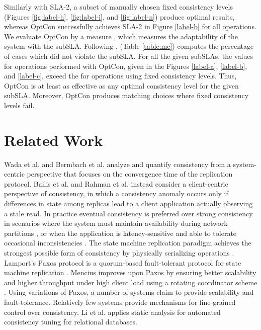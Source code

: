 \documentclass[conference]{IEEEtran}
\begin{document}
 Similarly with SLA-2, a subset of manually chosen fixed consistency levels (Figures \ref{fig:label-h}, \ref{fig:label-i}, and \ref{fig:label-n}) produce optimal results, whereas OptCon successfully achieves SLA-2 in Figure \ref{label-b} for all operations. We evaluate OptCon by a measure \emph{}, which measures the adaptability of the system with the subSLA. Following \cite{Terry:2013:CSL:2517349.2522731},  (Table \ref{table:mc}) computes the percentage of cases which did not violate the subSLA. For all the given subSLAs, the  values for operations performed with OptCon, given in the Figures \ref{label-a}, \ref{label-b}, and
\ref{label-c}, exceed the  for operations using fixed consistency levels. Thus, OptCon is at least as effective as any optimal
  consistency level for the given subSLA. Moreover, OptCon produces matching
choices where fixed consistency levels fail. 
\section{Related Work}\label{sec:related}
Wada et al. \cite{wada:cidr} and Bermbach et al. \cite{Bermbach} analyze and quantify consistency from a system-centric perspective that
	focuses on the convergence time of the replication protocol.
Bailis et al. \cite{Bailis:2012:PBS:2212351.2212359} and Rahman et al. \cite{Rahman:2012:TPF:2387858.2387866} instead consider a client-centric perspective of consistency,  in which a consistency anomaly occurs
	only if differences in state among replicas lead to a client application actually observing a stale read.
In practice eventual consistency is preferred over strong consistency in scenarios where the system must maintain availability during network partitions \cite{birman1996trading, bayou},
	or when the application is latency-sensitive and able to tolerate occasional inconsistencies
\cite{brew:cap}. The state machine replication paradigm achieves the strongest possible form of consistency
	by physically serializing operations \cite{lam_time}.
Lamport's Paxos protocol is a quorum-based fault-tolerant protocol for state machine replication \cite{DBLP:conf/opodis/Lamport02}.
Mencius improves upon Paxos by ensuring better scalability and higher throughput under high client load
	using a rotating coordinator scheme \cite{Mao:2008:MBE:1855741.1855767}.
  Using variations of Paxos, a number of systems \cite{journals/corr/abs-1103-2408, Bolosky:2011:PRS:1972457.1972472, Kraska:2013:MMC:2465351.2465363, Corbett:2012:SGG:2387880.2387905} claim to provide scalability and fault-tolerance. Relatively few systems \cite{conf/wecwis/YuV00, Terry:2013:CSL:2517349.2522731, Ardekani:2014:SGC:2685048.2685077, Sivaramakrishnan:2015:DPO:2813885.2737981} provide mechanisms for fine-grained control over consistency. Li et al. \cite{183989} applies static analysis for automated consistency tuning for relational databases.  
\end{document}
